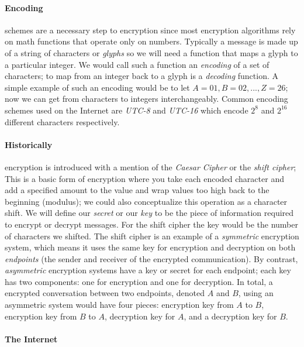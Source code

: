 \documentclass[12pt]{article}
\begin{document}
\paragraph{Encoding} schemes are a necessary step to encryption since most encryption algorithms rely on math functions that operate only on numbers.  Typically a message is made up of a string of characters or \textit{glyphs} so we will need a function that maps a glyph to a particular integer.  We would call such a function an \textit{encoding} of a set of characters; to map from an integer back to a glyph is a \textit{decoding} function.  A simple example of such an encoding would be to let $A=01,B=02,...,Z=26$; now we can get from characters to integers interchangeably.  Common encoding schemes used on the Internet are \textit{UTC-8} and \textit{UTC-16} which encode $2^8$ and $2^{16}$ different characters respectively.

\paragraph{Historically} encryption is introduced with a mention of the \textit{Caesar Cipher} or the \textit{shift cipher}; This is a basic form of encryption where you take each encoded character and add a specified amount to the value and wrap values too high back to the beginning (modulus); we could also conceptualize this operation as a character shift.  We will define our \textit{secret} or our \textit{key} to be the piece of information required to encrypt or decrypt messages.  For the shift cipher the key would be the number of characters we shifted.  The shift cipher is an example of a \textit{symmetric} encryption system, which means it uses the same key for encryption and decryption on both \textit{endpoints} (the sender and receiver of the encrypted communication).  By contrast, \textit{asymmetric} encryption systems have a key or secret for each endpoint; each key has two components: one for encryption and one for decryption.  In total, a encrypted conversation between two endpoints, denoted $A$ and $B$, using an asymmetric system would have four pieces: encryption key from $A$ to $B$, encryption key from $B$ to $A$, decryption key for $A$, and a decryption key for $B$.

\paragraph{The Internet} 
\end{document}
